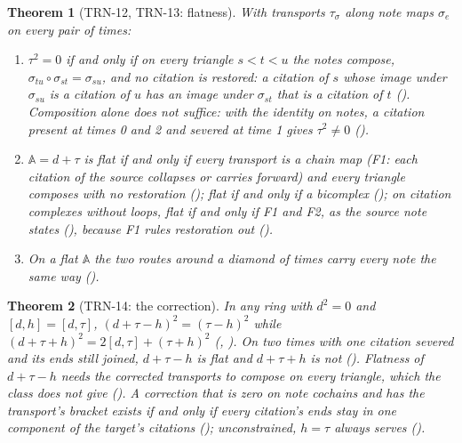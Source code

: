 \documentclass[11pt]{article}
\theoremstyle{plain}
\newtheorem{theorem}{Theorem}[section]
\theoremstyle{definition}
\theoremstyle{remark}
\newcommand{\A}{\mathbb{A}}
\begin{document}
\begin{theorem}[TRN-12, TRN-13: flatness]\label{thm:flat}
With transports $\tau_\sigma$ along note maps $\sigma_e$ on every pair of times:
\begin{enumerate}
  \item $\tau^2 = 0$ if and only if on every triangle $s < t < u$ the notes compose,
  $\sigma_{tu}\circ\sigma_{st} = \sigma_{su}$, and no citation is restored: a citation of $s$
  whose image under $\sigma_{su}$ is a citation of $u$ has an image under $\sigma_{st}$ that is a
  citation of $t$ (). Composition alone does not suffice: with the
  identity on notes, a citation present at times 0 and 2 and severed at time 1 gives
  $\tau^2 \ne 0$ ().
  \item $\A = d + \tau$ is flat if and only if every transport is a chain map (F1: each citation
  of the source collapses or carries forward) and every triangle composes with no restoration
  (); flat if and only if a bicomplex (); on citation
  complexes without loops, flat if and only if F1 and F2, as the source note states
  (), because F1 rules restoration out ().
  \item On a flat $\A$ the two routes around a diamond of times carry every note the same way
  ().
\end{enumerate}
\end{theorem}

\begin{theorem}[TRN-14: the correction]\label{thm:corr}
In any ring with $d^2 = 0$ and $[d, h] = [d, \tau]$, $(d + \tau - h)^2 = (\tau - h)^2$ while
$(d + \tau + h)^2 = 2[d, \tau] + (\tau + h)^2$ (,
). On two times with one citation severed and its ends still joined,
$d + \tau - h$ is flat and $d + \tau + h$ is not (). Flatness of
$d + \tau - h$ needs the corrected transports to compose on every triangle, which the class does
not give (). A correction that is zero on note cochains and has
the transport's bracket exists if and only if every citation's ends stay in one component of the
target's citations (); unconstrained, $h = \tau$ always serves
().
\end{theorem}
\end{document}
